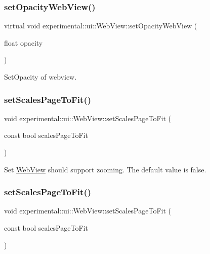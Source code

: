 \subsubsection{\texorpdfstring{set\+Opacity\+Web\+View()}{setOpacityWebView()}}
{\footnotesize\ttfamily virtual void experimental\+::ui\+::\+Web\+View\+::set\+Opacity\+Web\+View (\begin{DoxyParamCaption}\item[{float}]{opacity }\end{DoxyParamCaption})\hspace{0.3cm}{\ttfamily [virtual]}}

Set\+Opacity of webview. \mbox{\label{classexperimental_1_1ui_1_1WebView_ab55307e1ac4bca0f38df14589a3c0924}} 
\subsubsection{\texorpdfstring{set\+Scales\+Page\+To\+Fit()}{setScalesPageToFit()}\hspace{0.1cm}{\footnotesize\ttfamily [1/2]}}
{\footnotesize\ttfamily void experimental\+::ui\+::\+Web\+View\+::set\+Scales\+Page\+To\+Fit (\begin{DoxyParamCaption}\item[{const bool}]{scales\+Page\+To\+Fit }\end{DoxyParamCaption})}

Set \hyperlink{classexperimental_1_1ui_1_1WebView}{Web\+View} should support zooming. The default value is false. \mbox{\label{classexperimental_1_1ui_1_1WebView_ab55307e1ac4bca0f38df14589a3c0924}} 
\subsubsection{\texorpdfstring{set\+Scales\+Page\+To\+Fit()}{setScalesPageToFit()}\hspace{0.1cm}{\footnotesize\ttfamily [2/2]}}
{\footnotesize\ttfamily void experimental\+::ui\+::\+Web\+View\+::set\+Scales\+Page\+To\+Fit (\begin{DoxyParamCaption}\item[{const bool}]{scales\+Page\+To\+Fit }\end{DoxyParamCaption})}

